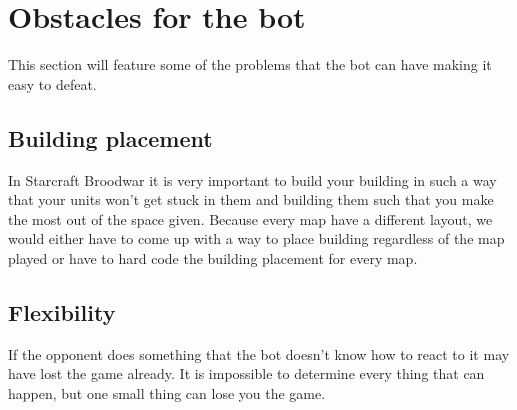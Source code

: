 \section{Obstacles for the bot}
	This section will feature some of the problems that the bot can have making it easy to defeat.
	\subsection*{Building placement}
		In Starcraft Broodwar it is very important to build your building in such a 
		way that your units won't get stuck in them and building them such that you make the most out of the space given. Because every map have 
		a different layout, we would either have to come up with a way to place building regardless of the map played or have to hard code the building 
		placement for every map.
	
	\subsection*{Flexibility}
		If the opponent does something that the bot doesn't know how to react to it may have lost the game already. 
		It is impossible to determine every 
		thing that can happen, but one small thing can lose you the game. 